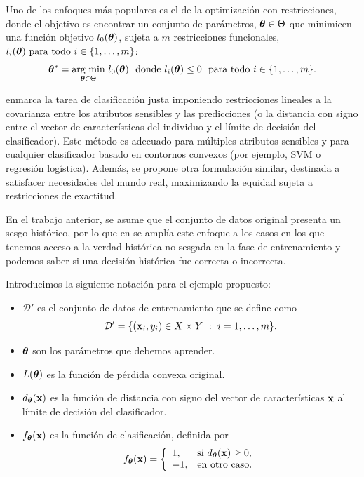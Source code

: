 \documentclass[oneside,openright,titlepage,numbers=noenddot,openany,headinclude,footinclude=true,
cleardoublepage=empty,abstractoff,BCOR=5mm,paper=a4,fontsize=12pt,main=spanish]{scrreprt}
\begin{document}
Uno de los enfoques más populares es el de la optimización con restricciones, donde el objetivo es encontrar un conjunto de parámetros, $\bm{\theta} \in \Theta$ que minimicen una función objetivo $l_0(\bm{\theta})$, sujeta a $m$ restricciones funcionales, $l_i(\btheta) \ \text{para todo} \ i \in \{1,\dots,m\}$: $$\bm{\theta}^\ast = \underset{\bm{\theta} \in \Theta}{\text{arg min}}  \ l_0(\bm{\theta}) \ \ \text{donde} \ l_i(\bm{\theta}) \leq 0 \ \ \text{para todo} \ i \in \{1,\dots,m\}.$$

\cite{constraints2017} enmarca la tarea de clasificación justa imponiendo restricciones lineales a la covarianza entre los atributos sensibles y las predicciones (o la distancia con signo entre el vector de características del individuo y el límite de decisión del clasificador). Este método es adecuado para múltiples atributos sensibles y para cualquier clasificador basado en contornos convexos (por ejemplo, SVM o regresión logística). Además, se propone otra formulación similar, destinada a satisfacer necesidades del mundo real, maximizando la equidad sujeta a restricciones de exactitud. 

En el trabajo anterior, se asume que el conjunto de datos original presenta un sesgo histórico, por lo que en \cite{disparate2017} se amplía este enfoque a los casos en los que tenemos acceso a la verdad histórica no sesgada en la fase de entrenamiento y podemos saber si una decisión histórica fue correcta o incorrecta.

\begin{notation}
Introducimos la siguiente notación para el ejemplo propuesto:

\begin{itemize}
    \item $\mathcal{D}'$ es el conjunto de datos de entrenamiento que se define como $$\mathcal{D}'=\{(\textbf{x}_i,y_i) \in X \times Y \ : \ i=1,\dots,m\}.$$
    \item $\bm{\theta}$ son los parámetros que debemos aprender.
    \item $L(\bm{\theta})$ es la función de pérdida convexa original.
    \item $d_{\bm{\theta}}(\textbf{x})$ es la función de distancia con signo del vector de características $\textbf{x}$ al límite de decisión del clasificador.
    \item $f_{\bm{\theta}}(\textbf{x})$ es la función de clasificación, definida por $$f_{\bm{\theta}}(\textbf{x})=\left \{
    \begin{array}{l l}
    1, & \mbox{si } d_{\bm{\theta}}(\textbf{x}) \geq 0, \\
    -1, & \mbox{en otro caso}.
    \end{array}
    \right.$$
\end{itemize}
\end{notation}
\end{document}
